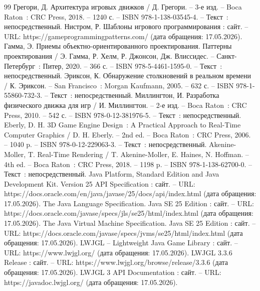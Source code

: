
\begin{thebibliography}{99}
	 Грегори, Д. Архитектура игровых движков / Д. Грегори. -- 3-е изд. -- Boca Raton~: CRC Press, 2018. -- 1240 с. -- ISBN 978-1-138-03545-4. -- Текст~: непосредственный.
	 Нистром, Р. Шаблоны игрового программирования : сайт. -- URL: https://gameprogrammingpatterns.com/ (дата обращения: 17.05.2026).
	 Гамма, Э. Приемы объектно-ориентированного проектирования. Паттерны проектирования / Э. Гамма, Р. Хелм, Р. Джонсон, Дж. Влиссидес. -- Санкт-Петербург~: Питер, 2020. -- 366 с. -- ISBN 978-5-4461-1595-0. -- Текст~: непосредственный.
	 Эриксон, К. Обнаружение столкновений в реальном времени / К. Эриксон. -- San Francisco~: Morgan Kaufmann, 2005. -- 632 с. -- ISBN 978-1-55860-732-3. -- Текст~: непосредственный.
	 Миллингтон, И. Разработка физического движка для игр / И. Миллингтон. -- 2-е изд. -- Boca Raton~: CRC Press, 2010. -- 542 с. -- ISBN 978-0-12-381976-5. -- Текст~: непосредственный.
	 Eberly, D. H. 3D Game Engine Design~: A Practical Approach to Real-Time Computer Graphics / D. H. Eberly. -- 2nd ed. -- Boca Raton~: CRC Press, 2006. -- 1040 p. -- ISBN 978-0-12-229063-3. -- Текст~: непосредственный.
	 Akenine-Moller, T. Real-Time Rendering / T. Akenine-Moller, E. Haines, N. Hoffman. -- 4th ed. -- Boca Raton~: CRC Press, 2018. -- 1198 p. -- ISBN 978-1-138-62700-0. -- Текст~: непосредственный.
	 Java Platform, Standard Edition and Java Development Kit. Version 25 API Specification : сайт. -- URL: https://docs.oracle.com/en/java/javase/25/docs/api/\allowbreak index.html (дата обращения: 17.05.2026).
	 The Java Language Specification. Java SE 25 Edition : сайт. -- URL: https://docs.oracle.com/javase/specs/jls/se25/html/\allowbreak index.html (дата обращения: 17.05.2026).
	 The Java Virtual Machine Specification. Java SE 25 Edition : сайт. -- URL: https://docs.oracle.com/javase/specs/jvms/se25/html/\allowbreak index.html (дата обращения: 17.05.2026).
	 LWJGL -- Lightweight Java Game Library : сайт. -- URL: https://www.lwjgl.org/ (дата обращения: 17.05.2026).
	 LWJGL 3.3.6 Release : сайт. -- URL: https://www.lwjgl.org/browse/release/3.3.6 (дата обращения: 17.05.2026).
	 LWJGL 3 API Documentation : сайт. -- URL: https://javadoc.lwjgl.org/ (дата обращения: 17.05.2026).

\end{thebibliography}
